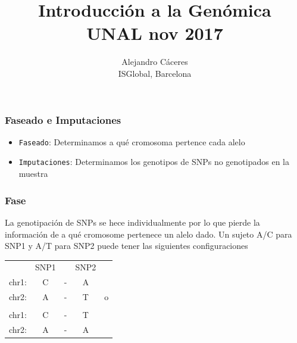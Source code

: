 \documentclass{beamer}\usepackage[]{graphicx}\usepackage[]{color}
\begin{document}
\title{Introducci\'on a la Gen\'omica \\ UNAL nov 2017}
\author{Alejandro C\'aceres \\ ISGlobal, Barcelona}


\maketitle


\begin{frame}[fragile]
\frametitle{Faseado e Imputaciones}

\begin{itemize}

\item {\tt Faseado}: Determinamos a qu\'e cromosoma pertence cada alelo 

\item {\tt Imputaciones}: Determinamos los genotipos de SNPs no genotipados en la muestra 

\end{itemize}
\end{frame}


\begin{frame}[fragile]
\frametitle{Fase}
La genotipaci\'on de SNPs se hece individualmente por lo que pierde la informaci\'on de
a qu\'e cromosome pertenece un alelo dado. Un sujeto A/C para SNP1 y A/T para SNP2 puede tener las siguientes configuraciones  

\begin{table}[]
\centering
\begin{tabular}{ccccc}
      &SNP1& &SNP2 & \\ 
chr1: &C   &-&  A& \\
chr2: &A   &-&  T& o \\
& & & &\\
chr1: &C   &-&  T& \\
chr2: &A   &-&  A&  \\
\end{tabular}

\end{table}
\end{frame}
\end{document}
